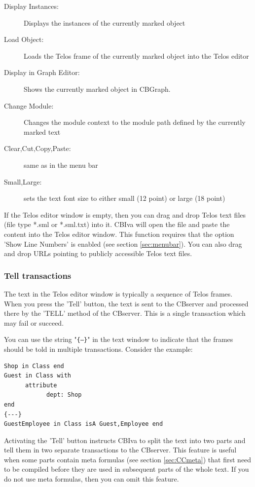 \begin{description}
\item[Display Instances:] Displays the instances of the currently marked object
\item[Load Object:] Loads the Telos frame of the currently marked object into the Telos editor
\item[Display in Graph Editor:] Shows the currently marked object in CBGraph.
\item[Change Module:] Changes the module context to the module path defined by the currently marked text
\item[Clear,Cut,Copy,Paste:] same as in the menu bar
\item[Small,Large:] sets the text font size to either small (12 point) or large (18 point)
\end{description}

If the Telos editor window is empty, then you can drag and drop Telos text files (file
type *.sml or *.sml.txt) into it. CBIva will open the file and paste the content into the Telos
editor window. This function requires that the option 'Show Line Numbers' is enabled
(see section \ref{sec:menubar}). You can also drag and drop URLs pointing to publicly accessible
Telos text files.

\subsubsection{Tell transactions}
The text in the Telos editor window is typically a sequence of Telos frames. When
you press the 'Tell' button, the text is sent to the CBserver and processed there by
the 'TELL' method of the CBserver. This is a single transaction which may fail or succeed.

You can use the string "{\tt \{---\}}" in the text window to indicate that the
frames should be told in multiple transactions. Consider the example:

{\small
\begin{verbatim}
Shop in Class end
Guest in Class with
      attribute
            dept: Shop
end
{---}
GuestEmployee in Class isA Guest,Employee end
\end{verbatim}
}


Activating the 'Tell' button instructs CBIva to split the text into two parts and tell them in two
separate transactions to the CBserver. This feature is useful when some parts contain meta formulas
(see section \ref{sec:CCmeta})
that first need to be compiled before they are used in subsequent parts of the whole text.
If you do not use meta formulas, then you can omit this feature.


